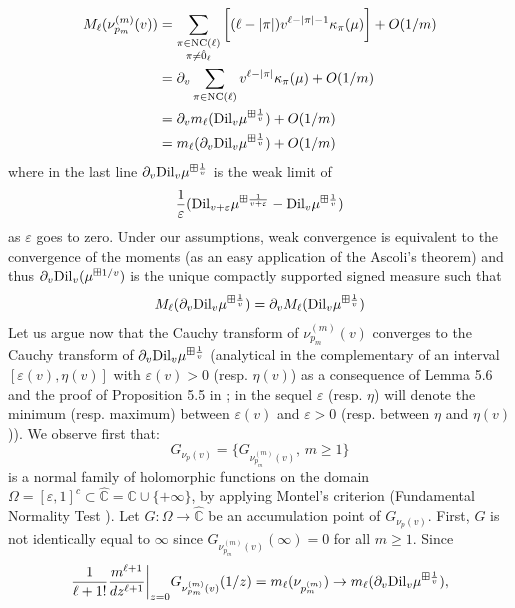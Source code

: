 \documentclass[12pt,reqno]{amsart}
\begin{document}
	\begin{align*}
		M_{\ell}(\nu_{p_m}^{(m)}(v)) & = \sum_{\substack{\pi \in {\rm NC }(\ell)                                              \\ \pi \neq \hat{0}_{\ell}}} \bigg[(\ell-|\pi|)v^{\ell-|\pi|-1}\kappa_{\pi}(\mu)\bigg]  + O({1}/{m}) \\
		                             & = \partial_{v} \sum_{\pi \in {\rm NC }(\ell)} v^{\ell-|\pi|}\kappa_{\pi}(\mu) + O(1/m) \\
		                             & = \partial_v m_{\ell}({\rm Dil}_v\mu^{\boxplus \frac{1}{v}}) + O(1/m)           \\
		                             & = m_{\ell}(\partial_v {\rm Dil}_v\mu^{\boxplus \frac{1}{v}}) + O(1/m)
	\end{align*}
    where in the last line $\partial_v {\rm Dil}_v\mu^{\boxplus \frac{1}{v}}$ is the weak limit of 
    $$
    \frac{1}{\varepsilon } ( {\rm Dil}_{v+\varepsilon}\mu^{\boxplus \frac{1}{v+\varepsilon}} - {\rm Dil}_{v}\mu^{\boxplus \frac{1}{v}})
    $$
    as $\varepsilon$ goes to zero.
    Under our assumptions, weak convergence is equivalent to the convergence of the moments (as an easy application of the Ascoli's theorem) and thus $\partial_v {\rm Dil}_v(\mu^{\boxplus 1/v})$ is the unique compactly supported signed measure such that 
    $$
    M_{\ell}(\partial_v {\rm Dil}_v\mu^{\boxplus \frac{1}{v}}) = \partial_v M_{\ell}({\rm Dil}_v\mu^{\boxplus \frac{1}{v}}) 
    $$
	Let us argue now that the Cauchy transform of $\nu_{p_m}^{(m)}(v)$ converges to the Cauchy transform of $\partial_v {\rm Dil}_v\mu^{\boxplus \frac{1}{v}}$ (analytical in the complementary of an interval $[\varepsilon(v),\eta(v)]$ with $\varepsilon(v) > 0$ (resp. $\eta(v)$) as a consequence of Lemma 5.6 and the proof of Proposition 5.5 in \cite{arizmendi2024s}; in the sequel $\varepsilon$ (resp. $\eta$) will denote the minimum (resp. maximum) between $\varepsilon(v)$ and $\varepsilon >0$ (resp. between $\eta$ and $\eta(v)$)). We observe first that:
	$$G_{\nu_p(v)} = \{G_{\nu^{(m)}_{p_m}(v)},\, m \geq 1\}$$ is a normal family of holomorphic functions on the domain $\Omega = [\varepsilon,1]^{c} \subset \hat{\mathbb{C}} = \mathbb{C} \cup \{+\infty\}$, by applying Montel's criterion (Fundamental Normality Test \cite{schiff1993normal}). Let $G\colon \Omega\to \hat{\mathbb{C}}$ be an accumulation point of $G_{\nu_p(v)}$. First, $G$ is not identically equal to $\infty$ since $G_{\nu^{(m)}_{p_m}(v)}(\infty)=0$ for all $m \geq 1$.
	Since
	$$
		\frac{1}{\ell+1!}\frac{m^{\ell+1}}{dz^{\ell+1}}\biggr|_{z=0}G_{\nu^{(m)}_{p_m}(v)}(1/z) = m_{\ell}(\nu_{p_m^{(m)}}) \rightarrow  m_{\ell}(\partial_v {\rm Dil}_v\mu^{\boxplus \frac{1}{v}}),
	$$
\end{document}
